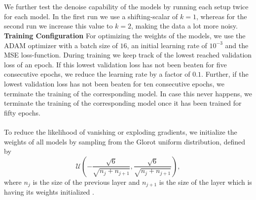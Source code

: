 \documentclass[./main.tex]{subfiles}
\begin{document}
\\
\\
We further test the denoise capability of the models by running each setup twice for each model. In the first run we use a shifting-scalar of $k = 1$, whereas for the second run we increase this value to $k = 2$, making the data a lot more noisy.
\\
\textbf{Training Configuration} For optimizing the weights of the models, we use the ADAM optimizer with a batch size of $16$, an initial learning rate of $10^{-3}$ and the MSE loss-function. During training we keep track of the lowest reached validation loss of an epoch. If this lowest validation loss has not been beaten for five consecutive epochs, we reduce the learning rate by a factor of $0.1$. Further, if the lowest validation loss has not been beaten for ten consecutive epochs, we terminate the training of the corresponding model. In case this never happens, we terminate the training of the corresponding model once it has been trained for fifty epochs.
\\
\\
To reduce the likelihood of vanishing or exploding gradients, we initialize the weights of all models by sampling from the Glorot uniform distribution, defined by
\begin{equation}
    \mathcal{U} \left(- \frac{\sqrt{6}}{\sqrt{n_j + n_{j + 1}}}, \frac{\sqrt{6}}{\sqrt{n_j + n_{j + 1}}} \right),
\end{equation}
where $n_j$ is the size of the previous layer and $n_{j + 1}$ is the size of the layer which is having its weights initialized \cite{glorot2010understanding}.
\end{document}
